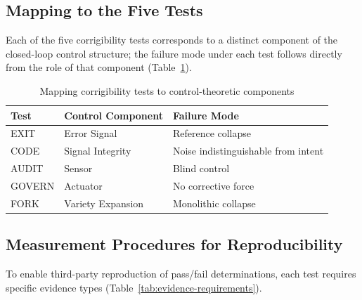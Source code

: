 \documentclass{article}
\begin{document}
\subsection{Mapping to the Five Tests}

Each of the five corrigibility tests corresponds to a distinct component of the closed-loop control structure; the failure mode under each test follows directly from the role of that component (Table~\ref{tab:control-mapping}).

\begin{table}[htbp]
\centering
\caption{Mapping corrigibility tests to control-theoretic components}
\label{tab:control-mapping}
\begin{tabular}{lll}
\hline
\textbf{Test} & \textbf{Control Component} & \textbf{Failure Mode} \\
\hline
EXIT & Error Signal & Reference collapse \\
CODE & Signal Integrity & Noise indistinguishable from intent \\
AUDIT & Sensor & Blind control \\
GOVERN & Actuator & No corrective force \\
FORK & Variety Expansion & Monolithic collapse \\
\hline
\end{tabular}
\end{table}

\subsection{Measurement Procedures for Reproducibility}
\label{subsec:measurement}

To enable third-party reproduction of pass/fail determinations, each test requires specific evidence types (Table~\ref{tab:evidence-requirements}).
\end{document}
